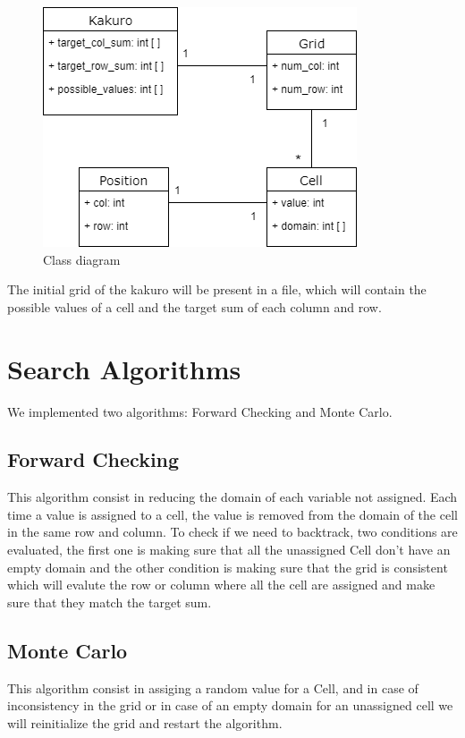 \documentclass[journal, a4paper]{IEEEtran}
\begin{document}
\begin{figure}[h!]
    	 \begin{center}
		\includegraphics[width=\columnwidth]{class_diagram.png}
  		\caption{Class diagram}
		\label{fig:class_diagram}
    	 \end{center}
\end{figure}
The initial grid of the kakuro will be present in a file, which will contain the possible values of a cell and the target sum of each column and row.

\section{Search Algorithms}
We implemented two algorithms: Forward Checking and Monte Carlo.
\subsection{Forward Checking}
This algorithm consist in reducing the domain of each variable not assigned. Each time a value is assigned to a cell, the value is removed from the domain of the cell in the same row and column. To check if we need to backtrack, two conditions are evaluated, the first one is making sure that all the unassigned Cell don't have an empty domain and the other condition is making sure that the grid is consistent which will evalute the row or column where all the cell are assigned and make sure that they match the target sum.

\subsection{Monte Carlo}
This algorithm consist in assiging a random value for a Cell, and in case of inconsistency in the grid or in case of an empty domain for an unassigned cell we will reinitialize the grid and restart the algorithm. 
\end{document}
